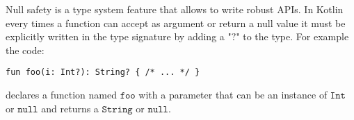 Null safety is a type system feature that allows to write robust APIs. In Kotlin every times a function can accept as argument or return a null value it must be explicitly written in the type signature by adding a "$\mathtt{?}$" to the type. For example the code:
\begin{lstlisting}[language={kotac}]
fun foo(i: Int?): String? { /* ... */ }
\end{lstlisting}
declares a function named $\mathtt{foo}$ with a parameter that can be an instance of $\mathtt{Int}$ or $\mathtt{null}$ and returns a $\mathtt{String}$ or $\mathtt{null}$.
